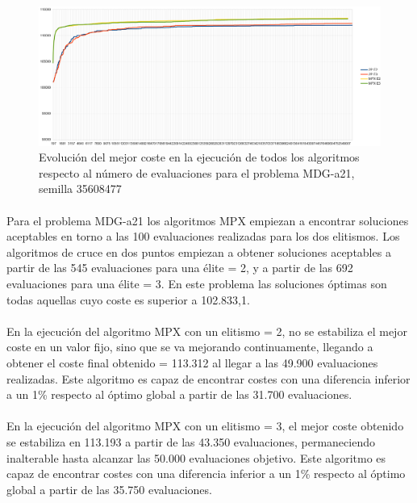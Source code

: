 	\begin{figure}[H]
		\centering
		\includegraphics[scale=0.3]{img/35608477_MDG-a_21_n2000_m200.png}
		\caption{Evolución del mejor coste en la ejecución de todos los algoritmos respecto al número de evaluaciones para el problema MDG-a21, semilla 35608477}
		\label{MDG-a_21_historico}
	\end{figure}

	\paragraph{}Para el problema MDG-a21 los algoritmos MPX empiezan a encontrar soluciones aceptables en torno a las 100 evaluaciones realizadas para los dos elitismos. Los algoritmos de cruce en dos puntos empiezan a obtener soluciones aceptables a partir de las 545 evaluaciones para una élite = 2, y a partir de las 692 evaluaciones para una élite = 3. En este problema las soluciones óptimas son todas aquellas cuyo coste es superior a 102.833,1.
	
	\paragraph{}En la ejecución del algoritmo MPX con un elitismo = 2, no se estabiliza el mejor coste en un valor fijo, sino que se va mejorando continuamente, llegando a obtener el coste final obtenido = 113.312 al llegar a las 49.900 evaluaciones realizadas. Este algoritmo es capaz de encontrar costes con una diferencia inferior a un 1\% respecto al óptimo global a partir de las 31.700 evaluaciones.
	
	\paragraph{}En la ejecución del algoritmo MPX con un elitismo = 3, el mejor coste obtenido se estabiliza en 113.193 a partir de las 43.350 evaluaciones, permaneciendo inalterable hasta alcanzar las 50.000 evaluaciones objetivo. Este algoritmo es capaz de encontrar costes con una diferencia inferior a un 1\% respecto al óptimo global a partir de las 35.750 evaluaciones.
	
